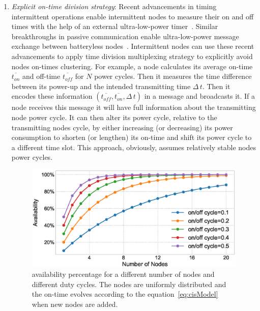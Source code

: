 \begin{enumerate}[label=\roman*.]%
%
		\item \textit{Explicit on-time division strategy}: Recent advancements in timing intermittent operations enable intermittent nodes to measure their on and off times with the help of an external ultra-low-power timer~\cite{hester2017timely}. Similar breakthroughs in passive communication enable ultra-low-power message exchange between batteryless nodes~\cite{li2015retro}. Intermittent nodes can use these recent advancements to apply time division multiplexing strategy to explicitly avoid nodes on-times clustering. For example, a node calculates its average on-time $\overline{t_{on}}$ and off-time $\overline{t_{off}}$ for $N$ power cycles. Then it measures the time difference between its power-up and the intended transmitting time $\Delta\,t$. Then it encodes these information $({\overline{t_{off}}, \overline{t_{on}}, \Delta\,t})$ in a message and broadcasts it. If a node receives this message it will have full information about the transmitting node power cycle. It can then alter its power cycle, relative to the transmitting nodes cycle, by either increasing (or decreasing) its power consumption to shorten (or lengthen) its on-time and shift its power cycle to a different time slot. This approach, obviously, assumes relatively stable nodes power cycles. 
%
\begin{figure}
		\centering
		\includegraphics[width=\columnwidth]{figures/cisModel}
		\caption{\fullsys availability percentage for a different number of nodes and different duty cycles. The nodes are uniformly distributed and the \sys on-time evolves according to the equation~\ref{eq:cisModel} when new nodes are added.}
		\label{fig:cisModel}
\end{figure} 
%

\end{enumerate}
